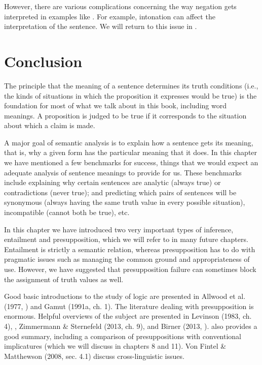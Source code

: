 However, there are various complications concerning the way negation gets interpreted in examples like . For example, intonation can affect the interpretation of the sentence. We will return to this issue in .


\section{Conclusion}\label{sec:} %

The principle that the meaning of a sentence determines its truth conditions (i.e., the kinds of situations in which the proposition it expresses would be true) is the foundation for most of what we talk about in this book, including word meanings. A proposition is judged to be true if it corresponds to the situation about which a claim is made.



A major goal of semantic analysis is to explain how a sentence gets its meaning, that is, why a given form has the particular meaning that it does. In this chapter we have mentioned a few benchmarks for success, things that we would expect an adequate analysis of sentence meanings to provide for us. These benchmarks include explaining why certain sentences are analytic (always true) or contradictions (never true); and predicting which pairs of sentences will be synonymous (always having the same truth value in every possible situation), incompatible (cannot both be true), etc.



In this chapter we have introduced two very important types of inference, entailment and presupposition, which we will refer to in many future chapters. Entailment is strictly a semantic relation, whereas presupposition has to do with pragmatic issues such as managing the common ground and appropriateness of use. However, we have suggested that presupposition failure can sometimes block the assignment of truth values as well.



\furtherreading



Good basic introductions to the study of logic are presented in Allwood et al. (1977, ) and Gamut (1991a, ch. 1). The literature dealing with presupposition is enormous. Helpful overviews of the subject are presented in Levinson (1983, ch. 4), \citet{GeurtsBeaver2011}, Zimmermann \& Sternefeld (2013, ch. 9), and Birner (2013, ). \citet{Potts2015} also provides a good summary, including a comparison of presuppositions with conventional implicatures (which we will discuss in chapters 8 and 11). Von Fintel \& Matthewson (2008, sec. 4.1) discuss cross-linguistic issues.


